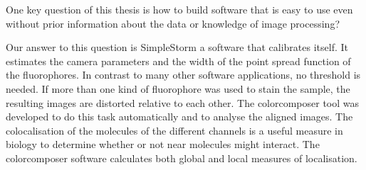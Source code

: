 One key question of this thesis is how to build software that is easy to use even without prior information about the data or knowledge of image processing? \newline

Our answer to this question is SimpleStorm a software that calibrates itself. It estimates the camera parameters and the width of the point spread function of the fluorophores. In contrast to many other software applications, no threshold is needed.\newline
If more than one kind of fluorophore was used to stain the sample, the resulting images are distorted relative to each other. The colorcomposer tool was developed to do this task automatically and to analyse the aligned images. The colocalisation of the molecules of the different channels is a useful measure in biology to determine whether or not near molecules might interact. The colorcomposer software calculates both global and local measures of localisation.


